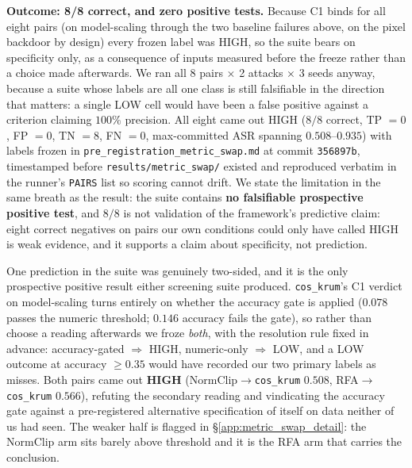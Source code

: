 \documentclass{article}
\begin{document}
\textbf{Outcome: 8/8 correct, and zero positive tests.} Because C1 binds for all eight pairs (on model-scaling through the two baseline failures above, on the pixel backdoor by design) every frozen label was HIGH, so the suite bears on specificity only, as a consequence of inputs measured before the freeze rather than a choice made afterwards. We ran all 8 pairs $\times$ 2 attacks $\times$ 3 seeds anyway, because a suite whose labels are all one class is still falsifiable in the direction that matters: a single LOW cell would have been a false positive against a criterion claiming $100\%$ precision. All eight came out HIGH ($8/8$ correct, TP $=0$, FP $=0$, TN $=8$, FN $=0$, max-committed ASR spanning $0.508$--$0.935$) with labels frozen in \texttt{pre\_registration\_metric\_swap.md} at commit \texttt{356897b}, timestamped before \texttt{results/metric\_swap/} existed and reproduced verbatim in the runner's \texttt{PAIRS} list so scoring cannot drift. We state the limitation in the same breath as the result: the suite contains \textbf{no falsifiable prospective positive test}, and $8/8$ is not validation of the framework's predictive claim: eight correct negatives on pairs our own conditions could only have called HIGH is weak evidence, and it supports a claim about specificity, not prediction.

One prediction in the suite was genuinely two-sided, and it is the only prospective positive result either screening suite produced. \texttt{cos\_krum}'s C1 verdict on model-scaling turns entirely on whether the accuracy gate is applied ($0.078$ passes the numeric threshold; $0.146$ accuracy fails the gate), so rather than choose a reading afterwards we froze \emph{both}, with the resolution rule fixed in advance: accuracy-gated $\Rightarrow$ HIGH, numeric-only $\Rightarrow$ LOW, and a LOW outcome at accuracy $\ge 0.35$ would have recorded our two primary labels as misses. Both pairs came out \textbf{HIGH} (NormClip$\to$\texttt{cos\_krum} $0.508$, RFA$\to$\texttt{cos\_krum} $0.566$), refuting the secondary reading and vindicating the accuracy gate against a pre-registered alternative specification of itself on data neither of us had seen. The weaker half is flagged in §\ref{app:metric_swap_detail}: the NormClip arm sits barely above threshold and it is the RFA arm that carries the conclusion.
\end{document}
